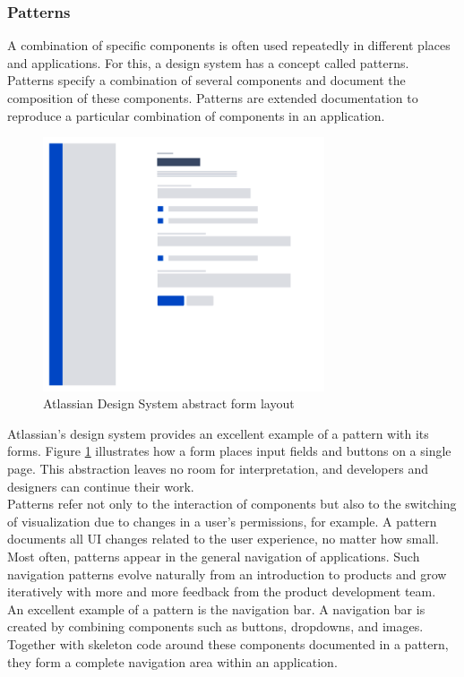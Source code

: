 \subsubsection{Patterns} \label{patterns}
A combination of specific components is often used repeatedly in different places and applications. For this, a design system has a concept called patterns.\\ 
Patterns specify a combination of several components and document the composition of these components. Patterns are extended documentation to reproduce a particular combination of components in an application. \\
\begin{figure}[htbp]
	\centerline{\includegraphics[height=7.5cm]{images/atlassian_abstract_form.png}}
	\caption{Atlassian Design System abstract form layout \cite{atlassian_design_system_atlassian_nodate}}
	\label{atlassian_form_layout}
\end{figure}
Atlassian's design system provides an excellent example of a pattern with its forms. Figure \ref{atlassian_form_layout} illustrates how a form places input fields and buttons on a single page. This abstraction leaves no room for interpretation, and developers and designers can continue their work. \\
Patterns refer not only to the interaction of components but also to the switching of visualization due to changes in a user's permissions, for example. A pattern documents all \ac{UI} changes related to the user experience, no matter how small. \cite{vesselov_building_2019} \\
Most often, patterns appear in the general navigation of applications. Such navigation patterns evolve naturally from an introduction to products and grow iteratively with more and more feedback from the product development team. \\
An excellent example of a pattern is the navigation bar. A navigation bar is created by combining components such as buttons, dropdowns, and images. Together with skeleton code around these components documented in a pattern, they form a complete navigation area within an application. 
